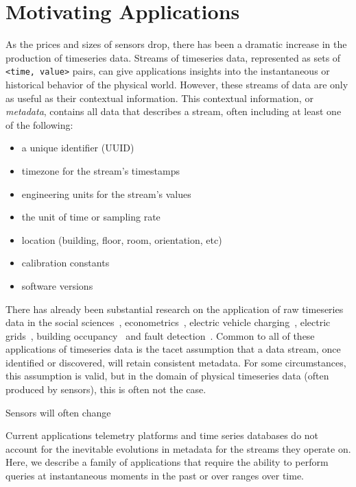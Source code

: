 \section{Motivating Applications}

As the prices and sizes of sensors drop, there has been a dramatic increase in
the production of timeseries data. Streams of timeseries data, represented as
sets of \texttt{<time, value>} pairs, can give applications insights into the
instantaneous or historical behavior of the physical world.  However, these
streams of data are only as useful as their contextual information.  This
contextual information, or \emph{metadata}, contains all data that describes a
stream, often including at least one of the following:

\begin{itemize}
\item a unique identifier (UUID)
\item timezone for the stream's timestamps
\item engineering units for the stream's values
\item the unit of time or sampling rate
\item location (building, floor, room, orientation, etc)
\item calibration constants
\item software versions
\end{itemize}

There has already been substantial research on the application of raw
timeseries data in the social sciences~\cite{mccleary1980applied},
econometrics~\cite{lutkepohl2004applied}, electric vehicle
charging~\cite{sortomme2011optimal}, electric
grids~\cite{carreras2004evidence}, building occupancy~\cite{richardson2008high}
and fault detection~\cite{fontugne2013strip}. Common to all of these
applications of timeseries data is the tacet assumption that a data stream,
once identified or discovered, will retain consistent metadata. For some circumstances,
this assumption is valid, but in the domain of physical timeseries data (often
produced by sensors), this is often not the case.

Sensors will often change

Current applications telemetry platforms and time series databases do not
account for the inevitable evolutions in metadata for the streams they operate
on. Here, we describe a family of applications that require the ability to
perform queries at instantaneous moments in the past or over ranges over time.

